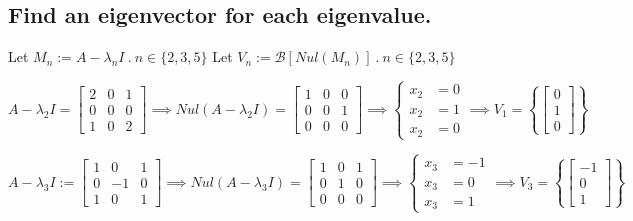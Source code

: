 \subsection{Find an eigenvector for each eigenvalue.}
\begin{center}
	Let $M_n := A-\lambda_n I ~.~ n \in \{ 2,3,5 \}$ \quad\quad Let $V_n := \mathscr{B}[Nul(M_n)] ~.~ n \in \{ 2,3,5 \}$
\end{center}
\[
	A-\lambda_2 I =
	\begin{bmatrix}
		2 & 0 & 1 \\
		0 & 0 & 0 \\
		1 & 0 & 2
	\end{bmatrix} \implies
	Nul(A-\lambda_2 I) = \begin{bmatrix}1&0&0\\ 0&0&1\\ 0&0&0\end{bmatrix}
	\implies
	\begin{cases}
		x_2 & = 0 \\
		x_2 & = 1 \\
		x_2 & = 0
	\end{cases}
	\implies V_1 = \left\{ \begin{bmatrix} 0 \\ 1 \\0 \end{bmatrix} \right\}
\]

\[
	A-\lambda_3 I :=
	\begin{bmatrix}
		1 & 0  & 1 \\
		0 & -1 & 0 \\
		1 & 0  & 1
	\end{bmatrix} \implies
	Nul(A-\lambda_3 I) = \begin{bmatrix}1&0&1\\ 0&1&0\\ 0&0&0\end{bmatrix}
	\implies \begin{cases}
		x_3 & = -1 \\
		x_3 & = 0  \\
		x_3 & = 1
	\end{cases}
	\implies V_3 = \left\{ \begin{bmatrix} -1 \\ 0 \\1 \end{bmatrix} \right\}
\]


